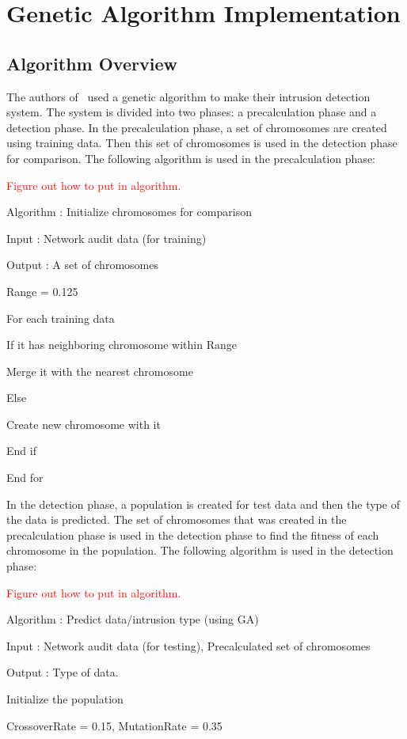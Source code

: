 \documentclass{sig-alternate}
\newcommand{\mycomment}[1]{\textcolor{red}{#1}}
\begin{document}
\section{Genetic Algorithm Implementation}

\subsection{Algorithm Overview}
The authors of~\cite{DBLP:journals/corr/abs-1204-1336} used a genetic algorithm to make their intrusion detection system. The system is divided into two phases: a precalculation phase and a detection phase. In the precalculation phase, a set of chromosomes are created using training data. Then this set of chromosomes is used in the detection phase for comparison. The following algorithm is used in the precalculation phase:

\mycomment{Figure out how to put in algorithm.}

Algorithm : Initialize chromosomes for comparison

Input : Network audit data (for training)

Output : A set of chromosomes

Range = 0.125

For each training data

   If it has neighboring chromosome within Range

      Merge it with the nearest chromosome

   Else

      Create new chromosome with it

   End if

End for 


In the detection phase, a population is created for test data and then the type of the data is predicted. The set of chromosomes that was created in the precalculation phase is used in the detection phase to find the fitness of each chromosome in the population. The following algorithm is used in the detection phase:

\mycomment{Figure out how to put in algorithm.}

Algorithm : Predict data/intrusion type (using GA)

Input : Network audit data (for testing), Precalculated set of chromosomes

Output : Type of data.

Initialize the population

CrossoverRate = 0.15, MutationRate = 0.35
\end{document}
